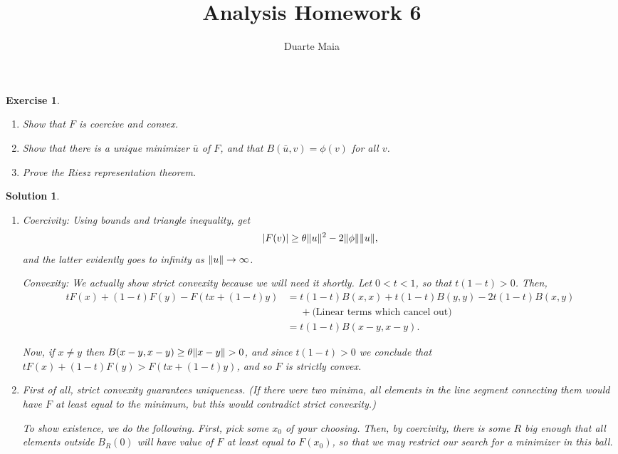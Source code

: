 \documentclass{article}
\title{Analysis Homework 6}
\author{Duarte Maia}
\newtheorem{ex}{Exercise}
\theoremstyle{nonumberplain}
\newtheorem{sol}{Solution}
\DeclarePairedDelimiter{\abs}{\lvert}{\rvert}
\DeclarePairedDelimiter{\Norm}{\lVert}{\rVert}
\begin{document}
\maketitle

\begin{ex}
\leavevmode
\begin{enumerate}
\item Show that $F$ is coercive and convex.
\item Show that there is a unique minimizer $\bar u$ of $F$, and that $B(\bar u, v) = \phi(v)$ for all $v$.
\item Prove the Riesz representation theorem.
\end{enumerate}
\end{ex}

\begin{sol}
\leavevmode
\begin{enumerate}
\item Coercivity: Using bounds and triangle inequality, get
\begin{equation}
\abs{F(v)} \geq \theta \Norm{u}^2 - 2 \Norm\phi \Norm u,
\end{equation}
and the latter evidently goes to infinity as $\Norm{u} \to \infty$.

Convexity: We actually show strict convexity because we will need it shortly. Let $0 < t < 1$, so that $t(1-t) > 0$. Then,
\begin{equation}
\begin{aligned}
t F(x) + (1-t) F(y) - F(t x + (1-t)y)
&= t(1-t) B(x,x) + t(1-t) B(y,y) - 2 t(1-t) B(x,y)\\
&\phantom{=} + \text{(Linear terms which cancel out)}\\
&= t(1-t) B(x-y,x-y).
\end{aligned}
\end{equation}

Now, if $x \neq y$ then $B(x-y,x-y) \geq \theta \Norm{x-y} > 0$, and since $t(1-t) > 0$ we conclude that $t F(x) + (1-t) F(y) > F(t x + (1-t)y)$, and so $F$ is strictly convex.

\item First of all, strict convexity guarantees uniqueness. (If there were two minima, all elements in the line segment connecting them would have $F$ at least equal to the minimum, but this would contradict strict convexity.)

To show existence, we do the following. First, pick some $x_0$ of your choosing. Then, by coercivity, there is some $R$ big enough that all elements outside $B_R(0)$ will have value of $F$ at least equal to $F(x_0)$, so that we may restrict our search for a minimizer in this ball.


\end{enumerate}
\end{sol}
\end{document}
